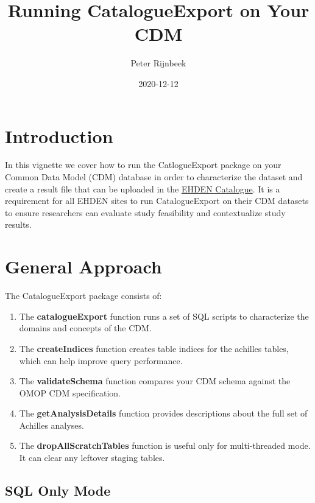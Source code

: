 \documentclass[
]{article}
\title{Running CatalogueExport on Your CDM}
\author{Peter Rijnbeek}
\date{2020-12-12}
\providecommand{\tightlist}{%
  \setlength{\itemsep}{0pt}\setlength{\parskip}{0pt}}
\begin{document}
\maketitle

{
\setcounter{tocdepth}{3}
\tableofcontents
}
\hypertarget{introduction}{%
\section{Introduction}\label{introduction}}

In this vignette we cover how to run the CatlogueExport package on your
Common Data Model (CDM) database in order to characterize the dataset
and create a result file that can be uploaded in the
\href{https://portal.ehden.eu}{EHDEN Catalogue}. It is a requirement for
all EHDEN sites to run CatalogueExport on their CDM datasets to ensure
researchers can evaluate study feasibility and contextualize study
results.

\hypertarget{general-approach}{%
\section{General Approach}\label{general-approach}}

The CatalogueExport package consists of:

\begin{enumerate}
\def\labelenumi{\arabic{enumi}.}
\tightlist
\item
  The \textbf{catalogueExport} function runs a set of SQL scripts to
  characterize the domains and concepts of the CDM.
\item
  The \textbf{createIndices} function creates table indices for the
  achilles tables, which can help improve query performance.
\item
  The \textbf{validateSchema} function compares your CDM schema against
  the OMOP CDM specification.
\item
  The \textbf{getAnalysisDetails} function provides descriptions about
  the full set of Achilles analyses.
\item
  The \textbf{dropAllScratchTables} function is useful only for
  multi-threaded mode. It can clear any leftover staging tables.
\end{enumerate}

\hypertarget{sql-only-mode}{%
\subsection{SQL Only Mode}\label{sql-only-mode}}
\end{document}
